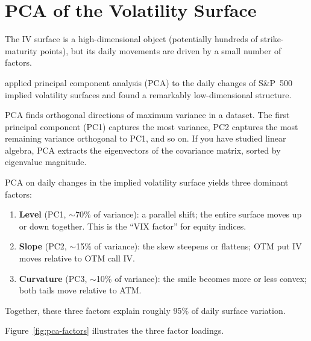 \section{PCA of the Volatility Surface}
\label{sec:pca-iv-surface}

The IV surface is a high-dimensional object (potentially hundreds of strike-maturity points), but its daily movements are driven by a small number of factors.

\citet{Cont2002} applied principal component analysis (PCA) to the daily changes of S\&P~500 implied volatility surfaces and found a remarkably low-dimensional structure.

\begin{prereq}
PCA finds orthogonal directions of maximum variance in a dataset.
The first principal component (PC1) captures the most variance, PC2 captures the most remaining variance orthogonal to PC1, and so on.
If you have studied linear algebra, PCA extracts the eigenvectors of the covariance matrix, sorted by eigenvalue magnitude.
\end{prereq}

\begin{keyresult}
\label{res:pca-iv}
PCA on daily changes in the implied volatility surface yields three dominant factors:
\begin{enumerate}[nosep]
  \item \textbf{Level} (PC1, $\sim$70\% of variance): a parallel shift; the entire surface moves up or down together.
  This is the ``VIX factor'' for equity indices.
  \item \textbf{Slope} (PC2, $\sim$15\% of variance): the skew steepens or flattens; OTM put IV moves relative to OTM call IV.
  \item \textbf{Curvature} (PC3, $\sim$10\% of variance): the smile becomes more or less convex; both tails move relative to ATM.
\end{enumerate}
Together, these three factors explain roughly 95\% of daily surface variation.
\end{keyresult}

Figure~\ref{fig:pca-factors} illustrates the three factor loadings.

